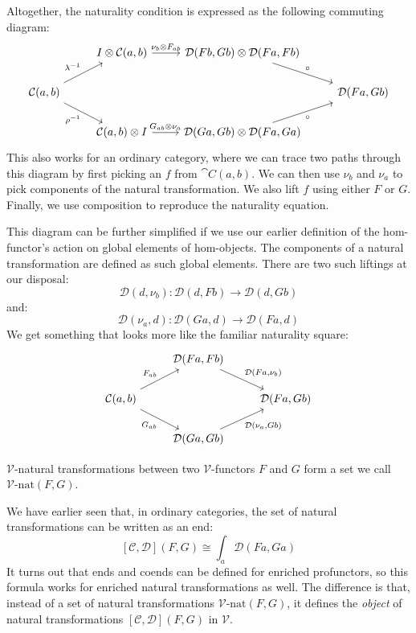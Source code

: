 \documentclass[DaoFP]{subfiles}
\begin{document}
Altogether, the naturality condition is expressed as the following commuting diagram:
\[
 \begin{tikzcd}
 & I \otimes \mathcal C(a, b)
 \arrow[r, "\nu_b \otimes F_{a b}"]
 & \mathcal D(F b, G b) \otimes \mathcal D(F a, F b)
 \arrow[dr, "\circ"]
 \\
 \mathcal C(a, b)
 \arrow[ur, "\lambda^{-1}"]
\arrow[dr, "\rho^{-1}"']
 &&& \mathcal D(F a, G b)
 \\
 & \mathcal C(a, b) \otimes I 
 \arrow[r, "G_{a b} \otimes \nu_a"]
 & \mathcal D(G a, G b) \otimes \mathcal D(F a, G a)
 \arrow[ur, "\circ"']
  \end{tikzcd}
\]
This also works for an ordinary category, where we can trace two paths through this diagram by first picking an $f$ from $\cat C(a, b)$. We can then use $\nu_b$ and $\nu_a$ to pick components of the natural transformation. We also lift $f$ using either $F$ or $G$. Finally, we use composition to reproduce the naturality equation.

This diagram can be further simplified if we use our earlier definition of  the hom-functor's action on global elements of hom-objects. The components of a natural transformation are defined as such global elements. There are two such liftings at our disposal:
\[ \mathcal D(d, \nu_b) \colon \mathcal D(d, F b) \to \mathcal D(d, G b) \]
and:
\[ \mathcal D (\nu_a, d) \colon \mathcal D(G a, d) \to \mathcal D(F a, d) \]
We get something that looks more like the familiar naturality square:
\[
 \begin{tikzcd}
 & \mathcal D(F a, F b)
  \arrow[dr, "{\mathcal D (F a, \nu_b)}"]
 \\
 \mathcal C(a, b) 
 \arrow[ur, "F_{a b}"]
 \arrow[dr, "G_{a b}"']
 && \mathcal D(F a, G b)
 \\
& \mathcal D (G a, G b)
\arrow[ur, "{\mathcal D (\nu_a, G b)}"']
 \end{tikzcd}
\]


$\mathcal V$-natural transformations between two $\mathcal V$-functors $F$ and $G$ form a set we call $\mathcal V\text{-nat} (F, G)$. 

We have earlier seen that, in ordinary categories, the set of natural transformations can be written as an end:
\[ [\mathcal C, \mathcal D](F, G) \cong \int_a \mathcal D(F a, G a) \]
It turns out that ends and coends can be defined for enriched profunctors, so this formula works for enriched natural transformations as well. The difference is that, instead of a set of natural transformations $\mathcal V\text{-nat} (F, G)$, it defines the \emph{object} of natural transformations $[\mathcal C, \mathcal D](F, G)$ in $\mathcal V$. 
\end{document}
